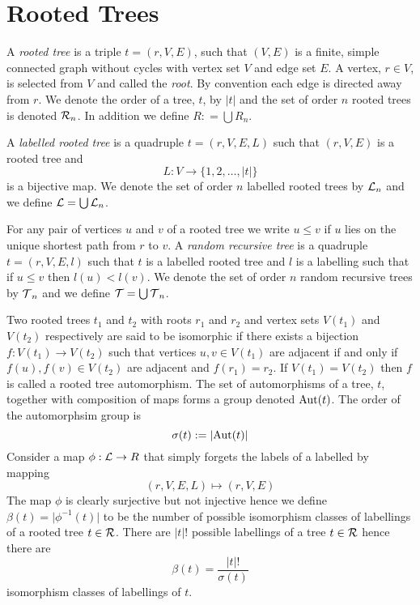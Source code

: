 \section{Rooted Trees}\label{sec:RootedTrees}
 A \emph{rooted tree} is a triple $t = (r,V,E)$, such that $(V,E)$ is a finite, simple connected graph without cycles with 
 vertex set $V$ and edge set $E$. A vertex, $r \in V$, is selected from $V$ and called the \emph{root}. By convention each edge is directed away from $r$.  We denote the
 order of a tree, $t$, by $\lvert t \rvert$ and the set of order $n$ rooted trees is denoted $\operatorname{\mathcal{R}}_n$.  In addition we define 
 $R : = \bigcup R_n$.
 
 A \emph{labelled rooted tree} is a quadruple $t = (r,V,E,L)$ such that $(r,V,E)$ is a rooted tree and 
 \[L: V \longrightarrow \{1,2,\dots,\lvert t \rvert\}\] 
is a bijective map.  We denote the set of order $n$ labelled rooted trees by $\operatorname{\mathcal{L}}_n$ and we define $\operatorname{\mathcal{L}} = \bigcup \operatorname{\mathcal{L}}_n$.      

For any pair of vertices $u$ and $v$ of a rooted tree we write $u \leq v$ if $u$ lies on the unique shortest path from $r$ to $v$.  A 
\emph{random recursive tree} is a quadruple $t = (r,V,E,l)$ such that $t$ is a labelled rooted tree and $l$ is a labelling 
such that if $u \leq v$ then $l(u) < l(v)$. 
We denote the set of order $n$ random recursive trees by $\operatorname{\mathcal{T}}_n$ and we define $\operatorname{\mathcal{T}} = \bigcup \operatorname{\mathcal{T}}_n$. 


Two rooted trees $t_1$ and $t_2$ with roots $r_1$ and $r_2$ and vertex sets $V(t_1)$ and $V(t_2)$ respectively are said to be
isomorphic if there exists a bijection $f: V(t_1) \rightarrow V(t_2)$ such that 
vertices $u,v \in V(t_1)$ are adjacent if and only if $f(u),f(v) \in V(t_2)$ are adjacent and $f(r_1) = r_2$. If 
$V(t_1) = V(t_2)$ then $f$ is called a rooted tree automorphism.  The set of automorphisms of a tree, $t$, together with 
composition of maps forms a group denoted $\operatorname{Aut}(t)$.  The order of the automorphsim group is 
\[\sigma(t) := \lvert \operatorname{Aut}(t) \rvert\] 
Consider a map $\phi: \operatorname{\mathcal{L}} \rightarrow R$ that simply forgets the labels of a labelled by mapping
\[
 (r,V,E,L) \mapsto (r,V,E)
\]
The map $\phi$ is clearly surjective but not injective hence we define $\beta(t) = \lvert \phi^{-1}(t) \rvert$ to be the number of
possible isomorphism classes of labellings of a rooted tree $t \in \operatorname{\mathcal{R}}$. There are $\lvert t \rvert !$ possible labellings of a tree 
$t \in \operatorname{\mathcal{R}}$ hence there are  
\begin{equation}\label{eq:1}
  \beta(t) = \frac{\lvert t \rvert !}{\sigma(t)} 
\end{equation}
isomorphism classes of labellings of $t$.  

